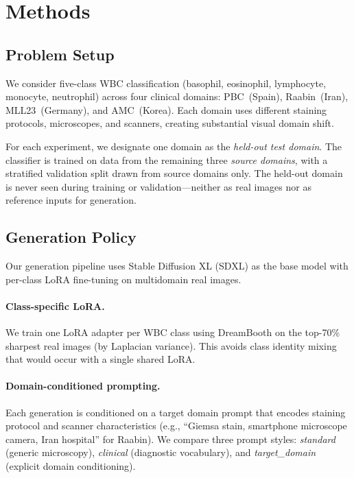\documentclass[10pt,twocolumn]{article}
\begin{document}
\section{Methods}
\label{sec:methods}

\subsection{Problem Setup}

We consider five-class WBC classification (basophil, eosinophil,
lymphocyte, monocyte, neutrophil) across four clinical domains:
PBC~(Spain), Raabin~(Iran), MLL23~(Germany), and AMC~(Korea). Each
domain uses different staining protocols, microscopes, and scanners,
creating substantial visual domain shift.

For each experiment, we designate one domain as the \emph{held-out test
domain}. The classifier is trained on data from the remaining three
\emph{source domains}, with a stratified validation split drawn from
source domains only. The held-out domain is never seen during training or
validation---neither as real images nor as reference inputs for
generation.

\subsection{Generation Policy}
\label{sec:generation-policy}

Our generation pipeline uses Stable Diffusion XL (SDXL) as the base
model with per-class LoRA fine-tuning on multidomain real images.

\paragraph{Class-specific LoRA.}
We train one LoRA adapter per WBC class using DreamBooth on the top-70\%
sharpest real images (by Laplacian variance). This avoids class identity
mixing that would occur with a single shared LoRA.

\paragraph{Domain-conditioned prompting.}
Each generation is conditioned on a target domain prompt that encodes
staining protocol and scanner characteristics (e.g., ``Giemsa stain,
smartphone microscope camera, Iran hospital'' for Raabin). We compare
three prompt styles: \emph{standard} (generic microscopy), \emph{clinical}
(diagnostic vocabulary), and \emph{target\_domain} (explicit domain
conditioning).
\end{document}
